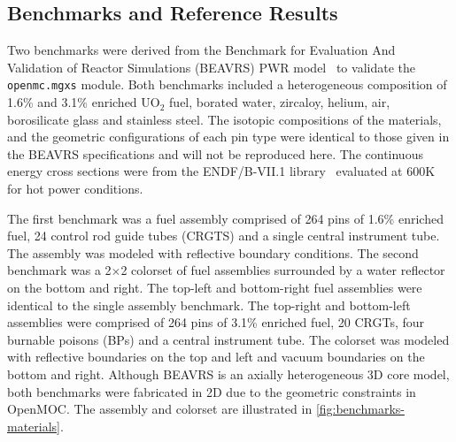 \subsection{Benchmarks and Reference Results}
\label{subsec:benchmarks}

Two benchmarks were derived from the Benchmark for Evaluation And Validation of Reactor Simulations (BEAVRS) PWR model~\cite{horelik2013beavrs} to validate the \texttt{openmc.mgxs} module. Both benchmarks included a heterogeneous composition of 1.6\% and 3.1\% enriched UO$_2$ fuel, borated water, zircaloy, helium, air, borosilicate glass and stainless steel. The isotopic compositions of the materials, and the geometric configurations of each pin type were identical to those given in the BEAVRS specifications and will not be reproduced here. The continuous energy cross sections were from the ENDF/B-VII.1 library~\cite{mcnpx2003manual} evaluated at 600K for hot power conditions.

The first benchmark was a fuel assembly comprised of 264 pins of 1.6\% enriched fuel, 24 control rod guide tubes (CRGTS) and a single central instrument tube. The assembly was modeled with reflective boundary conditions. The second benchmark was a 2$\times$2 colorset of fuel assemblies surrounded by a water reflector on the bottom and right. The top-left and bottom-right fuel assemblies were identical to the single assembly benchmark. The top-right and bottom-left assemblies were comprised of 264 pins of 3.1\% enriched fuel, 20 CRGTs, four burnable poisons (BPs) and a central instrument tube. The colorset was modeled with reflective boundaries on the top and left and vacuum boundaries on the bottom and right. Although BEAVRS is an axially heterogeneous 3D core model, both benchmarks were fabricated in 2D due to the geometric constraints in OpenMOC. The assembly and colorset are illustrated in \autoref{fig:benchmarks-materials}.

